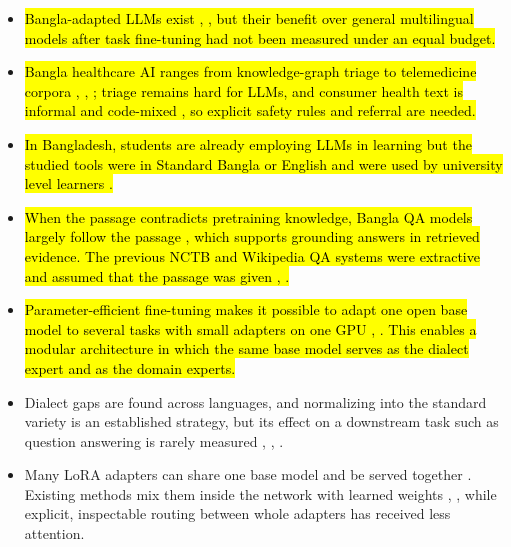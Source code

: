 \begin{itemize}
\item \hl{Bangla-adapted LLMs exist \cite{raihan2025tigerllm}, \cite{titulm2025}, but their benefit
over general multilingual models after task fine-tuning had not been
measured under an equal budget.}

\item \hl{Bangla healthcare AI ranges from knowledge-graph triage to
telemedicine corpora \cite{nahar2025amardoctor}, \cite{saha2026doctalkbn}, \cite{khan2023banglachqsumm}; triage remains hard
for LLMs, and consumer health text is informal and code-mixed \cite{khan2023nervous},
so explicit safety rules and referral are needed.}

\item \hl{In Bangladesh, students are already employing
LLM\textquotesingle s in learning but the studied tools were in Standard
Bangla or English and were used by university level learners \cite{hossain2025ailiteracy}.}

\item \hl{When the passage contradicts pretraining knowledge, Bangla QA
models largely follow the passage \cite{azmary2026banglacqa}, which supports grounding
answers in retrieved evidence. The previous NCTB and Wikipedia QA
systems were extractive and assumed that the passage was given \cite{mayeesha2021bengaliqa},
\cite{khondoker2024unlocking}.}

\item \hl{Parameter-efficient fine-tuning makes it possible to adapt one
open base model to several tasks with small adapters on one GPU
\cite{hu2022lora}, \cite{dettmers2023qlora}. This enables a modular architecture in which the
same base model serves as the dialect expert and as the domain experts.}

\item Dialect gaps are found across languages, and normalizing into the
standard variety is an established strategy, but its effect on a
downstream task such as question answering is rarely measured
\cite{faisal2024dialectbench}, \cite{kantharuban2023dialectgap},
\cite{honnet2018swissgerman}.

\item Many LoRA adapters can share one base model and be served together
\cite{sheng2024slora}. Existing methods mix them inside the network with
learned weights \cite{wu2024mole}, \cite{huang2024lorahub}, while
explicit, inspectable routing between whole adapters has received less
attention.
\end{itemize}

